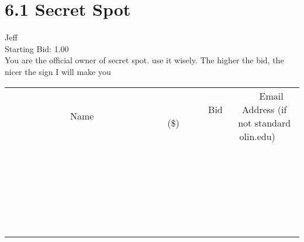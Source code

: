 \documentclass[11pt]{article}
\begin{document}
					\section*{6.1 Secret Spot}
					Jeff \\
					Starting Bid: 1.00 \\
					You are the official owner of secret spot. use it wisely. The higher the bid, the nicer the sign I will make you \\
					[6ex]
					\begin{tabular}{c c c}
						~~~~~~~~~~~~~Name~~~~~~~~~~~~~ & ~~~~~~~~~Bid (\$)~~~~~~~~~ & ~~~Email Address (if not standard olin.edu)~~~ \\
				
 & & \\
\hline
 & & \\
\hline
 & & \\
\hline
 & & \\
\hline
 & & \\
\hline
 & & \\
\hline
 & & \\
\hline
 & & \\
\hline
 & & \\
\hline
 & & \\
\hline
 & & \\
\hline
 & & \\
\hline
 & & \\
\hline
 & & \\
\hline
 & & \\
\hline
 & & \\
\hline
 & & \\
\hline
 & & \\
\hline
 & & \\
\hline
 & & \\
\hline
 & & \\
\hline
 & & \\
\hline
 & & \\
\hline
 & & \\
\hline
 & & \\
\hline
 & & \\
\hline
					\end{tabular}
					\clearpage
				
\end{document}
